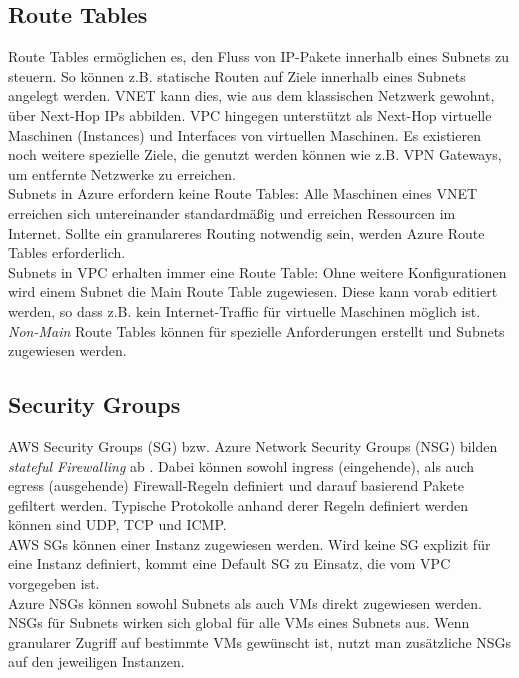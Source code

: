 \subsection{Route Tables}
Route Tables ermöglichen es, den Fluss von IP-Pakete innerhalb eines Subnets zu steuern. So können z.B. statische Routen auf Ziele innerhalb eines Subnets angelegt werden. VNET kann dies, wie aus dem klassischen Netzwerk gewohnt, über Next-Hop IPs abbilden. VPC hingegen unterstützt als Next-Hop virtuelle Maschinen (Instances) und Interfaces von virtuellen Maschinen. Es existieren noch weitere spezielle Ziele, die genutzt werden können wie z.B. VPN Gateways, um entfernte Netzwerke zu erreichen.\\
Subnets in Azure erfordern keine Route Tables: Alle Maschinen eines VNET erreichen sich untereinander standardmäßig und erreichen Ressourcen im Internet. Sollte ein granulareres Routing notwendig sein, werden Azure Route Tables erforderlich.\\
Subnets in VPC erhalten immer eine Route Table: Ohne weitere Konfigurationen wird einem Subnet die Main Route Table zugewiesen. Diese kann vorab editiert werden, so dass z.B. kein Internet-Traffic für virtuelle Maschinen möglich ist. \textit{Non-Main} Route Tables können für spezielle Anforderungen erstellt und Subnets zugewiesen werden.

\subsection{Security Groups}
AWS Security Groups (SG) bzw. Azure Network Security Groups (NSG) bilden \textit{stateful Firewalling} ab \cite{wool2006packet}. Dabei können sowohl ingress (eingehende), als auch egress (ausgehende) Firewall-Regeln definiert und darauf basierend Pakete gefiltert werden. Typische Protokolle anhand derer Regeln definiert werden können sind UDP, TCP und ICMP.\\
AWS SGs können einer Instanz zugewiesen werden. Wird keine SG explizit für eine Instanz definiert, kommt eine Default SG zu Einsatz, die vom VPC vorgegeben ist.\\
Azure NSGs können sowohl Subnets als auch VMs direkt zugewiesen werden. NSGs für Subnets wirken sich global für alle VMs eines Subnets aus. Wenn granularer Zugriff auf bestimmte VMs gewünscht ist, nutzt man zusätzliche NSGs \glqq auf\grqq{} den jeweiligen Instanzen.

